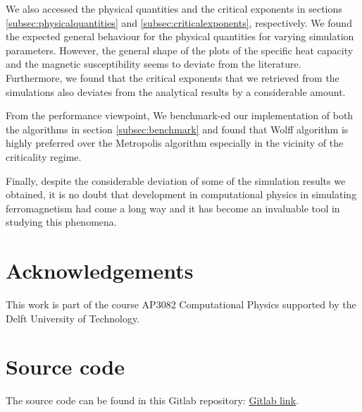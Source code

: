 \documentclass[pra,aps,superscriptaddress,amssymb,amsmath,reprint,noeprint,floatfix]{revtex4-2}
\begin{document}
We also accessed the physical quantities and the critical exponents in sections \ref{subsec:physicalquantities} and \ref{subsec:criticalexponents}, respectively. We found the expected general behaviour for the physical quantities for varying simulation parameters. However, the general shape of the plots of the specific heat capacity and the magnetic susceptibility seems to deviate from the literature. Furthermore, we found that the critical exponents that we retrieved from the simulations also deviates from the analytical results by a considerable amount. 

From the performance viewpoint, We benchmark-ed our implementation of both the algorithms in section \ref{subsec:benchmark} and found that Wolff algorithm is highly preferred over the Metropolis algorithm especially in the vicinity of the criticality regime.

Finally, despite the considerable deviation of some of the simulation results we obtained, it is no doubt that development in computational physics in simulating ferromagnetism had come a long way and it has become an invaluable tool in studying this phenomena.

\section{\label{sec:Acknowledgements}Acknowledgements}
This work is part of the course AP3082 Computational Physics supported by the Delft University of Technology.

\appendix\label{appendix}
\section{Source code}
The source code can be found in this Gitlab repository: \href{https://gitlab.kwant-project.org/computational_physics/projects/Project-2---Ising_juandaanieel_kwo/}{Gitlab link}.


\end{document}
